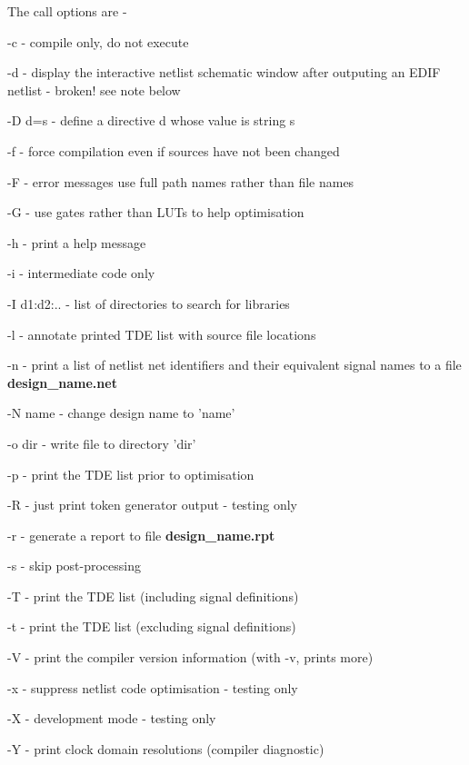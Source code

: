         The call options are - \label{options}
        \blist
        \item   -c - compile only, do not execute
        \item   -d - display the interactive netlist schematic window after
                outputing an EDIF netlist - broken! see note below
        \item   -D d=s - define a directive d whose value is string s
        \item   -f - force compilation even if sources have not been changed
        \item   -F - error messages use full path names rather than file names
        \item   -G - use gates rather than LUTs to help optimisation
        \item   -h - print a help message
        \item   -i - intermediate code only
        \item   -I d1:d2:.. - list of directories to search for libraries
        \item   -l - annotate printed TDE list with source file locations
        \item   -n - print a list of netlist net identifiers and their
                equivalent signal names to a file {\bf design\_name.net}
        \item   -N name - change design name to 'name'
        \item   -o dir - write file to directory 'dir'
        \item   -p - print the TDE list prior to optimisation
        \item   -R - just print token generator output - testing only
        \item   -r - generate a report to file {\bf design\_name.rpt}
        \item   -s - skip post-processing
        \item   -T - print the TDE list (including signal definitions)
        \item   -t - print the TDE list (excluding signal definitions)
        \item   -V - print the compiler version information 
	    		(with -v, prints more)
        \item   -x - suppress netlist code optimisation - testing only
        \item   -X - development mode - testing only
        \item   -Y - print clock domain resolutions (compiler diagnostic)
        \blend
        
